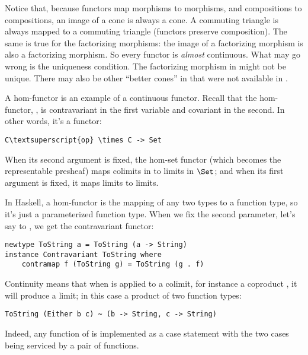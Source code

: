 \begin{figure}[H]
\centering
{}
\end{figure}

\noindent
Notice that, because functors map morphisms to morphisms, and
compositions to compositions, an image of a cone is always a cone. A
commuting triangle is always mapped to a commuting triangle (functors
preserve composition). The same is true for the factorizing morphisms:
the image of a factorizing morphism is also a factorizing morphism. So
every functor is \emph{almost} continuous. What may go wrong is the
uniqueness condition. The factorizing morphism in  might not be
unique. There may also be other ``better cones'' in  that were
not available in .

A hom-functor is an example of a continuous functor. Recall that the
hom-functor, , is contravariant in the first variable
and covariant in the second. In other words, it's a functor:

\begin{Verbatim}[commandchars=\\\{\}]
C\textsuperscript{op} \times C -> Set
\end{Verbatim}
When its second argument is fixed, the hom-set functor (which becomes
the representable presheaf) maps colimits in  to limits in
$\Set$; and when its first argument is fixed, it maps limits to
limits.

In Haskell, a hom-functor is the mapping of any two types to a function
type, so it's just a parameterized function type. When we fix the second
parameter, let's say to , we get the contravariant
functor:

\begin{Verbatim}[commandchars=\\\{\}]
newtype ToString a = ToString (a -> String) 
instance Contravariant ToString where 
    contramap f (ToString g) = ToString (g . f)
\end{Verbatim}
Continuity means that when  is applied to a colimit,
for instance a coproduct , it will produce a limit;
in this case a product of two function types:

\begin{Verbatim}[commandchars=\\\{\}]
ToString (Either b c) ~ (b -> String, c -> String)
\end{Verbatim}
Indeed, any function of  is implemented as a case
statement with the two cases being serviced by a pair of functions.

